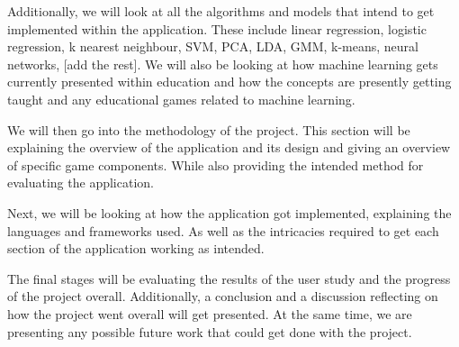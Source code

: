 		Additionally, we will look at all the algorithms and models that intend to get implemented within the application. These include linear regression, logistic regression, k nearest neighbour, SVM, PCA, LDA, GMM, k-means, neural networks, [add the rest]. We will also be looking at how machine learning gets currently presented within education and how the concepts are presently getting taught and any educational games related to machine learning.
		
		We will then go into the methodology of the project. This section will be explaining the overview of the application and its design and giving an overview of specific game components. While also providing the intended method for evaluating the application.
		
		Next, we will be looking at how the application got implemented, explaining the languages and frameworks used. As well as the intricacies required to get each section of the application working as intended. 
		
		The final stages will be evaluating the results of the user study and the progress of the project overall. Additionally, a conclusion and a discussion reflecting on how the project went overall will get presented. At the same time, we are presenting any possible future work that could get done with the project.
	
	